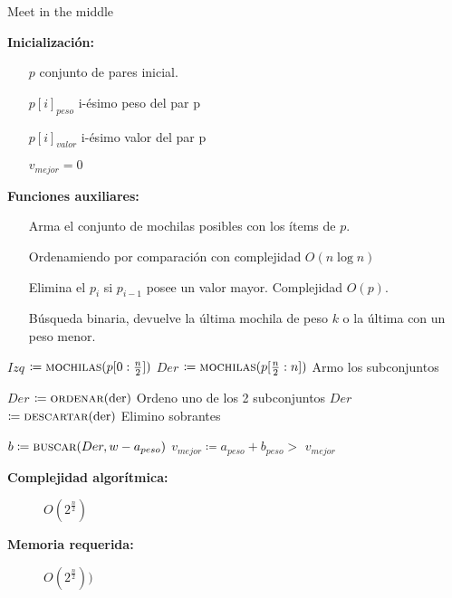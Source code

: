 \documentclass[fleqn, 11pt]{article}
\def\is{\coloneqq}
\begin{document}
\begin{algorithm}
\caption{Meet in the middle}
\begin{algorithmic}[1]
\item[\textbf{Inicialización:}]
\item[] \begin{itemize}
	\item[] $p$ conjunto de pares inicial.
	\item[] $p[i]_{peso}$ i-ésimo peso del par p
	\item[] $p[i]_{valor}$ i-ésimo valor del par p
	\item[] $v_{mejor} = 0$
\end{itemize}
\item[\textbf{Funciones auxiliares:}]
\item[] \begin{itemize}
	\setlength\itemsep{0.3em}
	\item[]  Arma el conjunto de mochilas posibles con
	los ítems de $p$.
	
	\item[]  Ordenamiendo por comparación con
	complejidad $O(n\log n)$
	
	\item[]  Elimina el $p_i$ si $p_{i-1}$ posee un
	valor mayor. Complejidad $O(p)$.

	\item[]  Búsqueda binaria, devuelve la última
	mochila de peso $k$ o la última con un peso menor.
\end{itemize}
\Statex
{}
\State $Izq$ $\is \Call{mochilas}{p[0:\frac{n}{2}]}$
\State $Der$ $\is \Call{mochilas}{p[\frac{n}{2}:n]}$
\Comment Armo los subconjuntos

\State $Der$ $\is \Call{ordenar}{\text{der}}$
\Comment Ordeno uno de los 2 subconjuntos
\State $Der$ $\is \Call{descartar}{\text{der}}$
\Comment Elimino sobrantes

	\State $b \is \Call{buscar}{Der, w - a_{peso}}$
			\State  $v_{mejor} \is a_{peso} + b_{peso} > $
		\EndIf
	\EndIf
\EndFor
\State \Return $v_{mejor}$
\EndFunction
\end{algorithmic}
\begin{description}
	\item[\textbf{Complejidad algorítmica:}] $O(2^{\frac{n}{2}})$
	\item[\textbf{Memoria requerida:}] $O(2^{\frac{n}{2}}))$
\end{description}
\end{algorithm}
\end{document}
